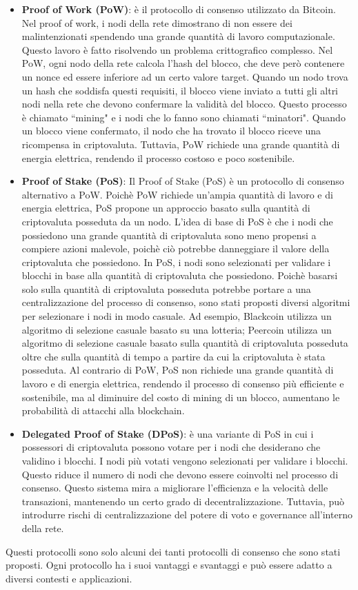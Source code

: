 \documentclass[../../Thesis.tex]{subfiles}
\begin{document}
\begin{itemize}
    \item \textbf{Proof of Work (PoW)}: \`e il protocollo di consenso utilizzato da Bitcoin. Nel proof of work, i nodi della rete dimostrano di non essere dei malintenzionati spendendo una grande quantit\`a di lavoro computazionale. Questo lavoro \`e fatto risolvendo un problema crittografico complesso. Nel PoW, ogni nodo della rete calcola l'hash del blocco, che deve per\`o contenere un nonce ed essere inferiore ad un certo valore target. Quando un nodo trova un hash che soddisfa questi requisiti, il blocco viene inviato a tutti gli altri nodi nella rete che devono confermare la validit\`a del blocco. Questo processo \`e chiamato ``mining" e i nodi che lo fanno sono chiamati ``minatori". Quando un blocco viene confermato, il nodo che ha trovato il blocco riceve una ricompensa in criptovaluta. Tuttavia, PoW richiede una grande quantit\`a di energia elettrica, rendendo il processo costoso e poco sostenibile.

    \item \textbf{Proof of Stake (PoS)}: Il Proof of Stake (PoS) \`e un protocollo di consenso alternativo a PoW. Poich\`e PoW richiede un'ampia quantit\`a di lavoro e di energia elettrica, PoS propone un approccio basato sulla quantit\`a di criptovaluta posseduta da un nodo. L'idea di base di PoS \`e che i nodi che possiedono una grande quantit\`a di criptovaluta sono meno propensi a compiere azioni malevole, poich\`e ci\`o potrebbe danneggiare il valore della criptovaluta che possiedono. In PoS, i nodi sono selezionati per validare i blocchi in base alla quantit\`a di criptovaluta che possiedono. Poich\`e basarsi solo sulla quantit\`a di criptovaluta posseduta potrebbe portare a una centralizzazione del processo di consenso, sono stati proposti diversi algoritmi per selezionare i nodi in modo casuale. Ad esempio, Blackcoin \cite{Blackcoin} utilizza un algoritmo di selezione casuale basato su una lotteria; Peercoin \cite{Peercoin} utilizza un algoritmo di selezione casuale basato sulla quantit\`a di criptovaluta posseduta oltre che sulla quantit\`a di tempo a partire da cui la criptovaluta \`e stata posseduta. Al contrario di PoW, PoS non richiede una grande quantit\`a di lavoro e di energia elettrica, rendendo il processo di consenso pi\`u efficiente e sostenibile, ma al diminuire del costo di mining di un blocco, aumentano le probabilit\`a di attacchi alla blockchain. 
    \item \textbf{Delegated Proof of Stake (DPoS)}: \`e una variante di PoS in cui i possessori di criptovaluta possono votare per i nodi che desiderano che validino i blocchi. I nodi pi\`u votati vengono selezionati per validare i blocchi. Questo riduce il numero di nodi che devono essere coinvolti nel processo di consenso. Questo sistema mira a migliorare l'efficienza e la velocit\`a delle transazioni, mantenendo un certo grado di decentralizzazione. Tuttavia, pu\`o introdurre rischi di centralizzazione del potere di voto e governance all'interno della rete.
\end{itemize}
Questi protocolli sono solo alcuni dei tanti protocolli di consenso che sono stati proposti. Ogni protocollo ha i suoi vantaggi e svantaggi e pu\`o essere adatto a diversi contesti e applicazioni.
\end{document}
